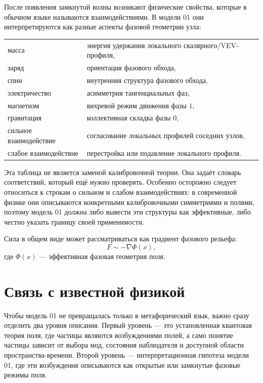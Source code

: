 \documentclass[11pt,a4paper]{article}
\begin{document}
После появления замкнутой волны возникают физические свойства, которые в обычном языке называются взаимодействиями. В модели 01 они интерпретируются как разные аспекты фазовой геометрии узла:
\begin{center}
\begin{tabular}{ll}
масса & энергия удержания локального скалярного/VEV-профиля, \\
заряд & ориентация фазового обхода, \\
спин & внутренняя структура фазового обхода, \\
электричество & асимметрия тангенциальных фаз, \\
магнетизм & вихревой режим движения фазы $1$, \\
гравитация & коллективная складка фазы $0$, \\
сильное взаимодействие & согласование локальных профилей соседних узлов, \\
слабое взаимодействие & перестройка или подавление локального профиля.
\end{tabular}
\end{center}

Эта таблица не является заменой калибровочной теории. Она задаёт словарь соответствий, который ещё нужно проверять. Особенно осторожно следует относиться к строкам о сильном и слабом взаимодействиях: в современной физике они описываются конкретными калибровочными симметриями и полями, поэтому модель 01 должна либо вывести эти структуры как эффективные, либо честно указать границу своей применимости.

Сила в общем виде может рассматриваться как градиент фазового рельефа:
\begin{equation}
F \sim -\nabla \Phi(x),
\end{equation}
где $\Phi(x)$ --- эффективная фазовая геометрия поля.

\section{Связь с известной физикой}

Чтобы модель 01 не превращалась только в метафорический язык, важно сразу отделить два уровня описания. Первый уровень --- это установленная квантовая теория поля, где частицы являются возбуждениями полей, а само понятие частицы зависит от выбора мод, состояния наблюдателя и доступной области пространства-времени. Второй уровень --- интерпретационная гипотеза модели 01, где эти возбуждения описываются как открытые или замкнутые фазовые режимы поля.
\end{document}
